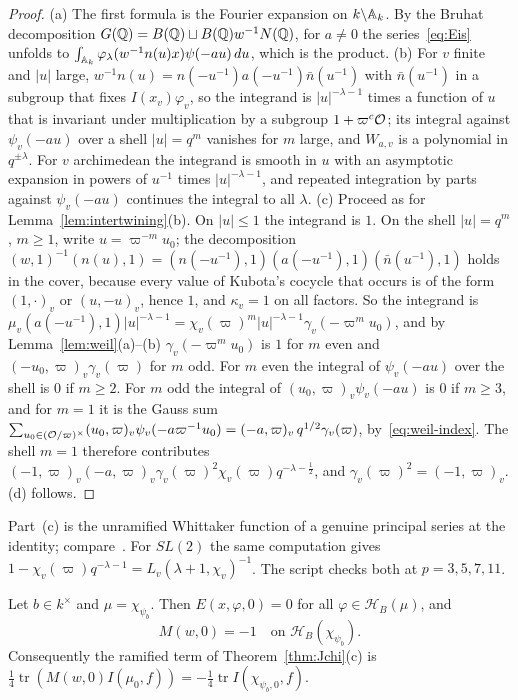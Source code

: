 \begin{proof}
(a) The first formula is the Fourier expansion on $k\backslash\mathbb{A}_k$. By
the Bruhat decomposition $G(\mathbb{Q})=B(\mathbb{Q})\sqcup B(\mathbb{Q})w^{-1}N(\mathbb{Q})$, for
$a\ne0$ the series~\eqref{eq:Eis} unfolds to $\int_{\mathbb{A}_k}\varphi_\lambda
(w^{-1}n(u)x)\psi(-au)\,du$, which is the product. (b) For $v$ finite and
$|u|$ large, $w^{-1}n(u)=n(-u^{-1})a(-u^{-1})\bar n(u^{-1})$ with $\bar
n(u^{-1})$ in a subgroup that fixes $I(x_v)\varphi_v$, so the integrand
is $|u|^{-\lambda-1}$ times a function of $u$ that is invariant under
multiplication by a subgroup $1+\varpi^c\mathcal{O}$; its integral against
$\psi_v(-au)$ over a shell $|u|=q^m$ vanishes for $m$ large, and
$W_{a,v}$ is a polynomial in $q^{\pm\lambda}$. For $v$ archimedean the
integrand is smooth in $u$ with an asymptotic expansion in powers of
$u^{-1}$ times $|u|^{-\lambda-1}$, and repeated integration by parts
against $\psi_v(-au)$ continues the integral to all $\lambda$. (c)
Proceed as for Lemma~\ref{lem:intertwining}(b). On $|u|\le1$ the
integrand is $1$. On the shell $|u|=q^m$, $m\ge1$, write
$u=\varpi^{-m}u_0$; the decomposition $(w,1)^{-1}(n(u),1)=(n(-u^{-1}),1)
(a(-u^{-1}),1)(\bar n(u^{-1}),1)$ holds in the cover, because every
value of Kubota's cocycle that occurs is of the form $(1,\cdot)_v$ or
$(u,-u)_v$, hence $1$, and $\kappa_v=1$ on all factors. So the integrand is
$\mu_v(a(-u^{-1}),1)|u|^{-\lambda-1}=\chi_v(\varpi)^m|u|^{-\lambda-1}
\gamma_v(-\varpi^mu_0)$, and by Lemma~\ref{lem:weil}(a)--(b)
$\gamma_v(-\varpi^mu_0)$ is $1$ for $m$ even and $(-u_0,\varpi)_v
\gamma_v(\varpi)$ for $m$ odd. For $m$ even the integral of $\psi_v(-au)$
over the shell is $0$ if $m\ge2$. For $m$ odd the integral of
$(u_0,\varpi)_v\psi_v(-au)$ is $0$ if $m\ge3$, and for $m=1$ it is the
Gauss sum $\sum_{u_0\in(\mathcal{O}/\varpi)^\times}(u_0,\varpi)_v\psi_v(-a\varpi^{-1}
u_0)=(-a,\varpi)_v\,q^{1/2}\gamma_v(\varpi)$, by~\eqref{eq:weil-index}. The
shell $m=1$ therefore contributes $(-1,\varpi)_v(-a,\varpi)_v\gamma_v
(\varpi)^2\chi_v(\varpi)q^{-\lambda-\frac12}$, and
$\gamma_v(\varpi)^2=(-1,\varpi)_v$. (d) follows.
\end{proof}

Part~(c) is the unramified Whittaker function of a genuine principal
series at the identity; compare~\cite{GPS80}. For $SL(2)$ the same
computation gives $1-\chi_v(\varpi)q^{-\lambda-1}=L_v(\lambda+1,\chi_v)
^{-1}$. The script checks both at $p=3,5,7,11$.

\begin{proposition}\label{prop:Mw0}
Let $b\in k^\times$ and $\mu=\chi_{\psi_b}$. Then $E(x,\varphi,0)=0$ for
all $\varphi\in\mathcal H_B(\mu)$, and
\[
M(w,0)=-1\quad\text{on }\mathcal H_B(\chi_{\psi_b}).
\]
Consequently the ramified term of Theorem~\ref{thm:Jchi}(c) is
$\frac14\operatorname{tr}(M(w,0)I(\mu_0,f))=-\frac14\operatorname{tr}
I(\chi_{\psi_b,0},f)$.
\end{proposition}

